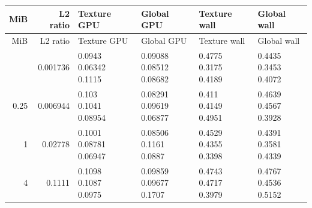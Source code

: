 \begingroup
\scriptsize
\setlength{\tabcolsep}{2.5pt}
\renewcommand{\arraystretch}{1.16}
\begin{longtable}{rrp{2.85cm}p{2.85cm}p{2.85cm}p{2.85cm}}
\toprule
MiB & L2 ratio & Texture GPU & Global GPU & Texture wall & Global wall \\
\midrule\endfirsthead
\toprule
MiB & L2 ratio & Texture GPU & Global GPU & Texture wall & Global wall \\
\midrule\endhead
\bottomrule\endfoot
0.0625 & 0.001736 & \shortstack[r]{0.0943\\0.06342\\0.1115} & \shortstack[r]{0.09088\\0.08512\\0.08682} & \shortstack[r]{0.4775\\0.3175\\0.4189} & \shortstack[r]{0.4435\\0.3453\\0.4072} \\
0.25 & 0.006944 & \shortstack[r]{0.103\\0.1041\\0.08954} & \shortstack[r]{0.08291\\0.09619\\0.06877} & \shortstack[r]{0.411\\0.4149\\0.4951} & \shortstack[r]{0.4639\\0.4567\\0.3928} \\
1 & 0.02778 & \shortstack[r]{0.1001\\0.08781\\0.06947} & \shortstack[r]{0.08506\\0.1161\\0.0887} & \shortstack[r]{0.4529\\0.4355\\0.3398} & \shortstack[r]{0.4391\\0.3581\\0.4339} \\
4 & 0.1111 & \shortstack[r]{0.1098\\0.1087\\0.0975} & \shortstack[r]{0.09859\\0.09677\\0.1707} & \shortstack[r]{0.4743\\0.4717\\0.3979} & \shortstack[r]{0.4767\\0.4536\\0.5152} \\

\end{longtable}
